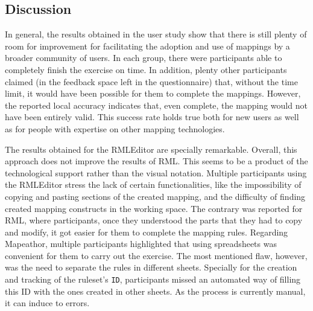 








\subsection{Discussion}
\label{sec:chp5_mapeathor_discussion}

In general, the results obtained in the user study show that there is still plenty of room for improvement for facilitating the adoption and use of mappings by a broader community of users. In each group, there were participants able to completely finish the exercise on time. In addition, plenty other participants claimed (in the feedback space left in the questionnaire) that, without the time limit, it would have been possible for them to complete the mappings. However, the reported local accuracy indicates that, even complete, the mapping would not have been entirely valid. This success rate holds true both for new users as well as for people with expertise on other mapping technologies. 

The results obtained for the RMLEditor are specially remarkable. Overall, this approach does not improve the results of RML. This seems to be a product of the technological support rather than the visual notation. Multiple participants using the RMLEditor stress the lack of certain functionalities, like the impossibility of copying and pasting sections of the created mapping, and the difficulty of finding created mapping constructs in the working space. The contrary was reported for RML, where participants, once they understood the parts that they had to copy and modify, it got easier for them to complete the mapping rules. Regarding Mapeathor, multiple participants highlighted that using spreadsheets was convenient for them to carry out the exercise. The most mentioned flaw, however, was the need to separate the rules in different sheets. Specially for the creation and tracking of the ruleset's \texttt{ID}, participants missed an automated way of filling this ID with the ones created in other sheets. As the process is currently manual, it can induce to errors.

